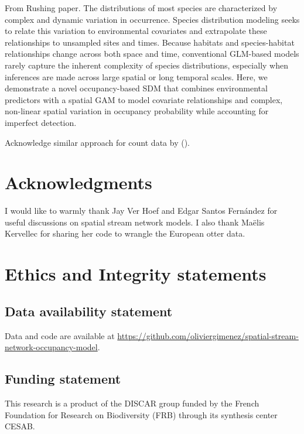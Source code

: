 \documentclass[
  11pt,
  a4paper,
]{article}
\begin{document}
From Rushing paper. The distributions of most species are characterized by complex and dynamic variation in occurrence. Species distribution modeling seeks to relate this variation to environmental covariates and extrapolate these relationships to unsampled sites and times. Because habitats and species-habitat relationships change across both space and time, conventional GLM-based models rarely capture the inherent complexity of species distributions, especially when inferences are made across large spatial or long temporal scales. Here, we demonstrate a novel occupancy-based SDM that combines environmental predictors with a spatial GAM to model covariate relationships and complex, non-linear spatial variation in occupancy probability while accounting for imperfect detection.

Acknowledge similar approach for count data by ().

\section{Acknowledgments}\label{acknowledgments}

I would like to warmly thank Jay Ver Hoef and Edgar Santos Fernández for useful discussions on spatial stream network models. I also thank Maëlis Kervellec for sharing her code to wrangle the European otter data.

\section{Ethics and Integrity statements}\label{ethics-and-integrity-statements}

\subsection{Data availability statement}\label{data-availability-statement}

Data and code are available at \href{https://github.com/oliviergimenez/spatial-stream-network-occupancy-model}{https://github.com/oliviergimenez/spatial-stream-network-occupancy-model}.

\subsection{Funding statement}\label{funding-statement}

This research is a product of the DISCAR group funded by the French Foundation for Research on Biodiversity (FRB) through its synthesis center CESAB.
\end{document}

